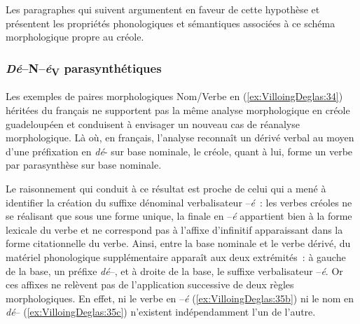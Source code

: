 \documentclass[output=paper]{langsci/langscibook}
\begin{document}
Les paragraphes qui suivent argumentent en faveur de cette hypothèse et
présentent les propriétés phonologiques et sémantiques associées à ce
schéma morphologique propre au créole.

\subsubsection{\texorpdfstring{\emph{Dé}--N--\emph{é}\textsubscript{V} parasynthétiques
}{Dé-N-éV parasynthétiques }}\label{dé-n-év-parasynthétiques}

Les exemples de paires morphologiques Nom/Verbe en (\ref{ex:VilloingDeglas:34}) héritées du
français ne supportent pas la même analyse morphologique en créole
guadeloupéen et conduisent à envisager un nouveau cas de réanalyse
morphologique. Là où, en français, l'analyse reconnaît un dérivé verbal
au moyen d'une préfixation en \emph{dé}- sur base nominale, le créole,
quant à lui, forme un verbe par parasynthèse sur base nominale.

Le raisonnement qui conduit à ce résultat est proche de celui qui a mené
à identifier la création du suffixe dénominal verbalisateur --\emph{é}~:
les verbes créoles ne se réalisant que sous une forme unique, la finale
en --\emph{é} appartient bien à la forme lexicale du verbe et ne
correspond pas à l'affixe d'infinitif apparaissant dans la forme
citationnelle du verbe. Ainsi, entre la base nominale et le verbe
dérivé, du matériel phonologique supplémentaire apparaît aux deux
extrémités~: à gauche de la base, un préfixe \emph{dé}--, et à droite de
la base, le suffixe verbalisateur --\emph{é}. Or ces affixes ne relèvent
pas de l'application successive de deux règles morphologiques. En effet,
ni le verbe en --\emph{é} (\ref{ex:VilloingDeglas:35b}) ni le nom en \emph{dé}-- (\ref{ex:VilloingDeglas:35c}) n'existent
indépendamment l'un de l'autre.
\end{document}
